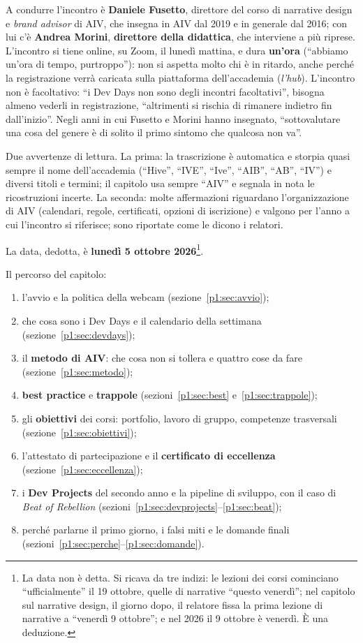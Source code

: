 A condurre l'incontro è \textbf{Daniele Fusetto}, direttore del corso di
narrative design e \emph{brand advisor} di AIV, che insegna in AIV dal 2019 e
in generale dal 2016; con lui c'è \textbf{Andrea Morini}, \textbf{direttore
della didattica}, che interviene a più riprese. L'incontro si tiene online,
su Zoom, il lunedì mattina, e dura \textbf{un'ora} (``abbiamo un'ora di tempo,
purtroppo''): non si aspetta molto chi è in ritardo, anche perché la
registrazione verrà caricata sulla piattaforma dell'accademia
(\emph{l'hub}). L'incontro non è facoltativo: ``i Dev Days non sono degli
incontri facoltativi'', bisogna almeno vederli in registrazione, ``altrimenti
si rischia di rimanere indietro fin dall'inizio''. Negli anni in cui
Fusetto e Morini hanno insegnato, ``sottovalutare una cosa del genere è di
solito il primo sintomo che qualcosa non va''.

Due avvertenze di lettura. La prima: la trascrizione è automatica e storpia
quasi sempre il nome dell'accademia (``Hive'', ``IVE'', ``Ive'', ``AIB'',
``AB'', ``IV'') e diversi titoli e termini; il capitolo usa sempre
``AIV'' e segnala in nota le ricostruzioni incerte. La seconda: molte
affermazioni riguardano l'organizzazione di AIV (calendari, regole,
certificati, opzioni di iscrizione) e valgono per l'anno a cui l'incontro si
riferisce; sono riportate come le dicono i relatori.

La data, dedotta, è \textbf{lunedì 5 ottobre 2026}\footnote{La data non è
detta. Si ricava da tre indizi: le lezioni dei corsi cominciano
``ufficialmente'' il 19 ottobre, quelle di narrative ``questo venerdì''; nel
capitolo sul narrative design, il giorno dopo, il relatore fissa la prima
lezione di narrative a ``venerdì 9 ottobre''; e nel 2026 il 9 ottobre è
venerdì. È una deduzione.}.

Il percorso del capitolo:
\begin{enumerate}
  \item l'avvio e la politica della webcam (sezione~\ref{p1:sec:avvio});
  \item che cosa sono i Dev Days e il calendario della settimana
        (sezione~\ref{p1:sec:devdays});
  \item il \textbf{metodo di AIV}: che cosa non si tollera e quattro cose da
        fare (sezione~\ref{p1:sec:metodo});
  \item \textbf{best practice} e \textbf{trappole}
        (sezioni~\ref{p1:sec:best} e~\ref{p1:sec:trappole});
  \item gli \textbf{obiettivi} dei corsi: portfolio, lavoro di gruppo,
        competenze trasversali (sezione~\ref{p1:sec:obiettivi});
  \item l'attestato di partecipazione e il \textbf{certificato di
        eccellenza} (sezione~\ref{p1:sec:eccellenza});
  \item i \textbf{Dev Projects} del secondo anno e la pipeline di sviluppo,
        con il caso di \emph{Beat of Rebellion}
        (sezioni~\ref{p1:sec:devprojects}--\ref{p1:sec:beat});
  \item perché parlarne il primo giorno, i falsi miti e le domande finali
        (sezioni~\ref{p1:sec:perche}--\ref{p1:sec:domande}).
\end{enumerate}

